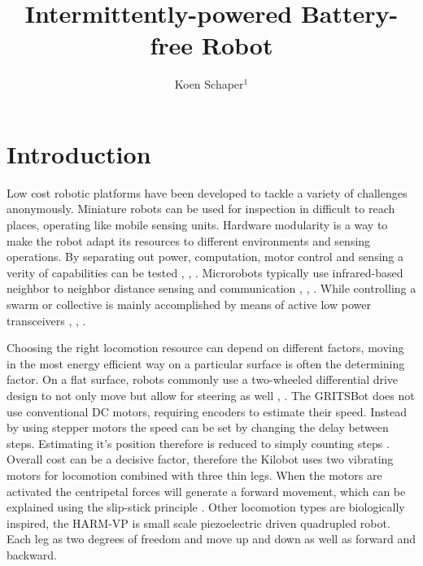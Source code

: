\documentclass[letterpaper, 10 pt, conference]{ieeeconf}  %
\title{\LARGE \bf
Intermittently-powered Battery-free Robot
}
\author{Koen Schaper$^{1}$ %
}
\begin{document}
\maketitle
\thispagestyle{empty}
\pagestyle{empty}






\section{Introduction}



Low cost robotic platforms have been developed to tackle a variety of challenges anonymously.
Miniature robots can be used for inspection in difficult to reach places, operating like mobile sensing units.
Hardware modularity is a way to make the robot adapt its resources to different environments and sensing operations.
By separating out power, computation, motor control and sensing a verity of capabilities can be tested \cite{sabelhaus_icra_2013}, \cite{pickem_icra_2015}, \cite{kim_iros_2016}.
Microrobots typically use infrared-based neighbor to neighbor distance sensing and communication \cite{rubenstein_icra_2012}, \cite{pickem_icra_2015}, \cite{kim_iros_2016}.
While controlling a swarm or collective is mainly accomplished by means of active low power transceivers \cite{sabelhaus_icra_2013}, \cite{pickem_icra_2015}, \cite{kim_iros_2016}. 


Choosing the right locomotion resource can depend on different factors, moving in the most energy efficient way on a particular surface is often the determining factor.
On a flat surface, robots commonly use a two-wheeled differential drive design to not only move but allow for steering as well \cite{sabelhaus_icra_2013}, \cite{pickem_icra_2015}.
The GRITSBot does not use conventional DC motors, requiring encoders to estimate their speed. 
Instead by using stepper motors the speed can be set by changing the delay between steps. 
Estimating it's position therefore is reduced to simply counting steps \cite{pickem_icra_2015}.  
Overall cost can be a decisive factor, therefore the Kilobot uses two vibrating motors for locomotion combined with three thin legs.
When the motors are activated the centripetal forces will generate a forward movement, which can be explained using the slip-stick principle \cite{rubenstein_icra_2012}.
Other locomotion types are biologically inspired, the HARM-VP is small scale piezoelectric driven quadrupled robot\cite{baisch_iros_2013}.
Each leg as two degrees of freedom and move up and down as well as forward and backward.
\end{document}
